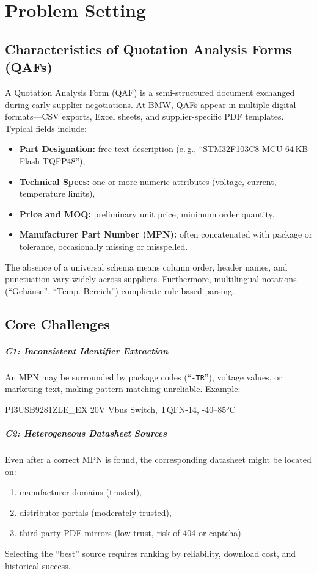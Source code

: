 \chapter{Problem Setting}
\label{chapter:problem}

\section{Characteristics of Quotation Analysis Forms (QAFs)}
A Quotation Analysis Form (QAF) is a semi-structured document exchanged during early supplier negotiations.  
At BMW, QAFs appear in multiple digital formats—CSV exports, Excel sheets, and supplier-specific PDF templates.  
Typical fields include:  

\begin{itemize}
  \item \textbf{Part Designation:} free-text description (e.\,g., ``STM32F103C8 MCU 64\,KB Flash TQFP48''),
  \item \textbf{Technical Specs:} one or more numeric attributes (voltage, current, temperature limits),
  \item \textbf{Price and MOQ:} preliminary unit price, minimum order quantity,
  \item \textbf{Manufacturer Part Number (MPN):} often concatenated with package or tolerance, occasionally missing or misspelled.
\end{itemize}

The absence of a universal schema means column order, header names, and punctuation vary widely across suppliers.  
Furthermore, multilingual notations (``Gehäuse'', ``Temp. Bereich'') complicate rule-based parsing.

\section{Core Challenges}
\paragraph{C1: Inconsistent Identifier Extraction}  
An MPN may be surrounded by package codes (``\texttt{-TR}''), voltage values, or marketing text, making pattern-matching unreliable.  
Example:  
\begin{center}
\ttfamily PI3USB9281ZLE\_EX   20V Vbus Switch, TQFN-14, -40–85°C
\end{center}

\paragraph{C2: Heterogeneous Datasheet Sources}  
Even after a correct MPN is found, the corresponding datasheet might be located on:
\begin{enumerate}
  \item manufacturer domains (trusted),
  \item distributor portals (moderately trusted),
  \item third-party PDF mirrors (low trust, risk of 404 or captcha).
\end{enumerate}
Selecting the ``best'' source requires ranking by reliability, download cost, and historical success.

